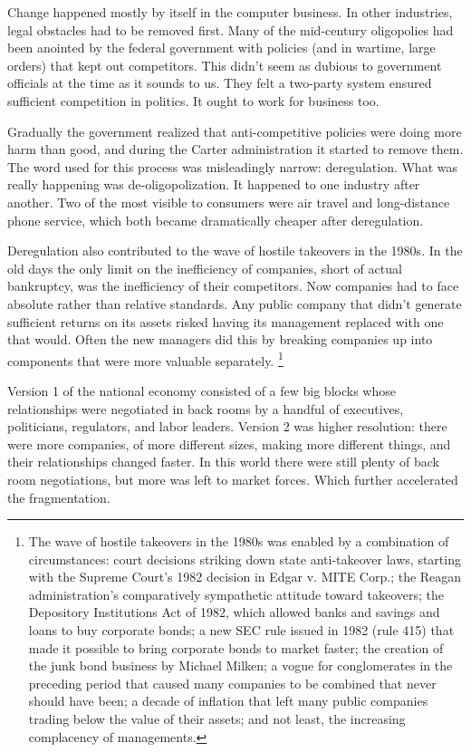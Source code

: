Change happened mostly by itself in the computer business. In other
industries, legal obstacles had to be removed first. Many of the
mid-century oligopolies had been anointed by the federal government with
policies (and in wartime, large orders) that kept out competitors. This
didn't seem as dubious to government officials at the time as it sounds
to us. They felt a two-party system ensured sufficient competition in
politics. It ought to work for business too.

Gradually the government realized that anti-competitive policies were
doing more harm than good, and during the Carter administration it
started to remove them. The word used for this process was misleadingly
narrow: deregulation. What was really happening was de-oligopolization.
It happened to one industry after another. Two of the most visible to
consumers were air travel and long-distance phone service, which both
became dramatically cheaper after deregulation.

Deregulation also contributed to the wave of hostile takeovers in the
1980s. In the old days the only limit on the inefficiency of companies,
short of actual bankruptcy, was the inefficiency of their competitors.
Now companies had to face absolute rather than relative standards. Any
public company that didn't generate sufficient returns on its assets
risked having its management replaced with one that would. Often the new
managers did this by breaking companies up into components that were
more valuable separately. \footnote{The wave of hostile takeovers in the 1980s was enabled by a
combination of circumstances: court decisions striking down state
anti-takeover laws, starting with the Supreme Court's 1982 decision in
Edgar v. MITE Corp.; the Reagan administration's comparatively
sympathetic attitude toward takeovers; the Depository Institutions Act
of 1982, which allowed banks and savings and loans to buy corporate
bonds; a new SEC rule issued in 1982 (rule 415) that made it possible to
bring corporate bonds to market faster; the creation of the junk bond
business by Michael Milken; a vogue for conglomerates in the preceding
period that caused many companies to be combined that never should have
been; a decade of inflation that left many public companies trading
below the value of their assets; and not least, the increasing
complacency of managements.}

Version 1 of the national economy consisted of a few big blocks whose
relationships were negotiated in back rooms by a handful of executives,
politicians, regulators, and labor leaders. Version 2 was higher
resolution: there were more companies, of more different sizes, making
more different things, and their relationships changed faster. In this
world there were still plenty of back room negotiations, but more was
left to market forces. Which further accelerated the fragmentation.

